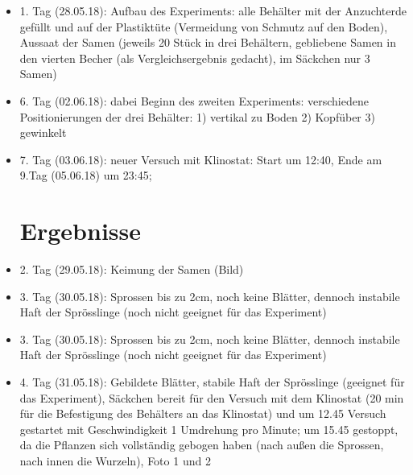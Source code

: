 \documentclass[
a4paper, 
11pt, 
ngerman,
listof=totoc,
bibliography=totocnumbered,
abstracton
]{scrreprt}
\begin{document}




\begin{itemize}
	
\item 1. Tag (28.05.18): Aufbau des Experiments: alle Behälter mit der Anzuchterde gefüllt und auf der Plastiktüte (Vermeidung von Schmutz auf den Boden), Aussaat der Samen (jeweils 20 Stück in drei Behältern, gebliebene Samen in den vierten Becher (als Vergleichsergebnis gedacht), im Säckchen nur 3 Samen)
	  
\item 6. Tag (02.06.18): dabei Beginn des zweiten Experiments: verschiedene Positionierungen der drei Behälter: 1) vertikal zu Boden 2) Kopfüber 3) gewinkelt 
	
\item 7. Tag (03.06.18): neuer Versuch mit Klinostat: Start um 12:40, Ende am 9.Tag (05.06.18) um 23:45; 

\section{Ergebnisse}

\item 2. Tag (29.05.18): Keimung der Samen (Bild)

\item 3. Tag (30.05.18): Sprossen bis zu 2cm, noch keine Blätter, dennoch instabile Haft der Sprösslinge (noch nicht geeignet für das Experiment) 

\item 3. Tag (30.05.18): Sprossen bis zu 2cm, noch keine Blätter, dennoch instabile Haft der Sprösslinge (noch nicht geeignet für das Experiment)

\item 4. Tag (31.05.18): Gebildete Blätter, stabile Haft der Sprösslinge (geeignet für das Experiment), Säckchen bereit für den Versuch mit dem Klinostat (20 min für die Befestigung des Behälters an das Klinostat) und um 12.45 Versuch gestartet mit Geschwindigkeit 1 Umdrehung pro Minute;
um 15.45 gestoppt, da die Pflanzen sich vollständig gebogen haben (nach außen die Sprossen, nach innen die Wurzeln), Foto 1 und 2


\end{itemize}
\end{document}
